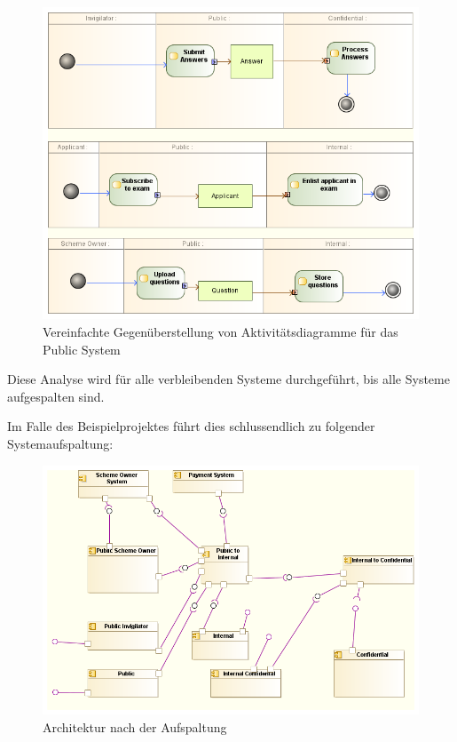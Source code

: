 \begin{figure}[H]
    \centering
    \includegraphics[scale=0.6]{uml/actorarch.png}
    \caption{Vereinfachte Gegenüberstellung von Aktivitätsdiagramme für das Public System}
    \label{fig:actorarch}
\end{figure}

Diese Analyse wird für alle verbleibenden Systeme durchgeführt, bis alle Systeme aufgespalten sind.

Im Falle des Beispielprojektes führt dies schlussendlich zu folgender Systemaufspaltung:

\begin{figure}[H]
    \centering
    \includegraphics[scale=0.6]{uml/vision4.png}
    \caption{Architektur nach der Aufspaltung }
\end{figure}

